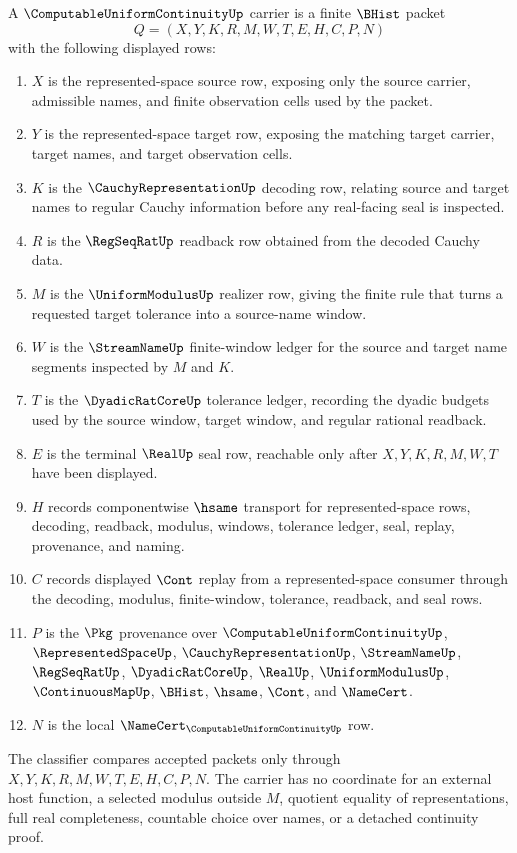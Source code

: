 \begin{definition}
\label{def:computable-uniform-continuity-carrier}
A $\ComputableUniformContinuityUp$ carrier is a finite $\BHist$ packet
$$
Q=(X,Y,K,R,M,W,T,E,H,C,P,N)
$$
with the following displayed rows:
\begin{enumerate}
\item $X$ is the represented-space source row, exposing only the source carrier, admissible names, and finite observation cells used by the packet.
\item $Y$ is the represented-space target row, exposing the matching target carrier, target names, and target observation cells.
\item $K$ is the $\CauchyRepresentationUp$ decoding row, relating source and target names to regular Cauchy information before any real-facing seal is inspected.
\item $R$ is the $\RegSeqRatUp$ readback row obtained from the decoded Cauchy data.
\item $M$ is the $\UniformModulusUp$ realizer row, giving the finite rule that turns a requested target tolerance into a source-name window.
\item $W$ is the $\StreamNameUp$ finite-window ledger for the source and target name segments inspected by $M$ and $K$.
\item $T$ is the $\DyadicRatCoreUp$ tolerance ledger, recording the dyadic budgets used by the source window, target window, and regular rational readback.
\item $E$ is the terminal $\RealUp$ seal row, reachable only after $X,Y,K,R,M,W,T$ have been displayed.
\item $H$ records componentwise $\hsame$ transport for represented-space rows, decoding, readback, modulus, windows, tolerance ledger, seal, replay, provenance, and naming.
\item $C$ records displayed $\Cont$ replay from a represented-space consumer through the decoding, modulus, finite-window, tolerance, readback, and seal rows.
\item $P$ is the $\Pkg$ provenance over $\ComputableUniformContinuityUp$, $\RepresentedSpaceUp$, $\CauchyRepresentationUp$, $\StreamNameUp$, $\RegSeqRatUp$, $\DyadicRatCoreUp$, $\RealUp$, $\UniformModulusUp$, $\ContinuousMapUp$, $\BHist$, $\hsame$, $\Cont$, and $\NameCert$.
\item $N$ is the local $\NameCert_{\ComputableUniformContinuityUp}$ row.
\end{enumerate}
The classifier compares accepted packets only through $X,Y,K,R,M,W,T,E,H,C,P,N$. The carrier has no coordinate for an external host function, a selected modulus outside $M$, quotient equality of representations, full real completeness, countable choice over names, or a detached continuity proof.
\end{definition}

